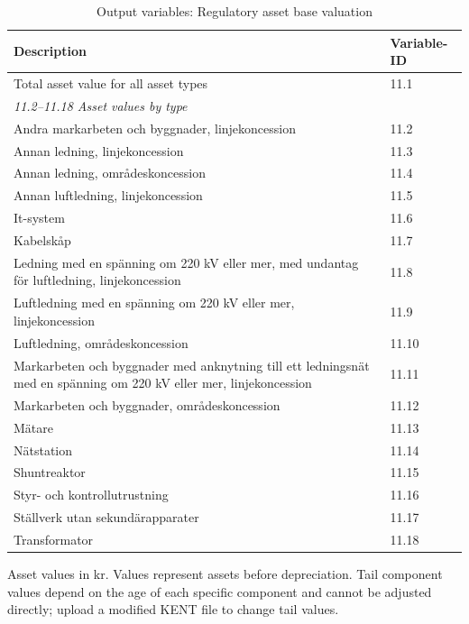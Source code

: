 \begin{table}[H]
\centering
\footnotesize
\begin{threeparttable}
\caption{Output variables: Regulatory asset base valuation}
\label{tab:rab-output-variables}
\begin{tabular}{@{}p{9cm}l@{}}
\toprule
\textbf{Description} & \textbf{Variable-ID} \\
\midrule
Total asset value for all asset types & 11.1 \\
\midrule
\multicolumn{2}{l}{\textit{11.2--11.18 Asset values by type}} \\
Andra markarbeten och byggnader, linjekoncession & 11.2 \\
Annan ledning, linjekoncession & 11.3 \\
Annan ledning, områdeskoncession & 11.4 \\
Annan luftledning, linjekoncession & 11.5 \\
It-system & 11.6 \\
Kabelskåp & 11.7 \\
Ledning med en spänning om 220 kV eller mer, med undantag för luftledning, linjekoncession & 11.8 \\
Luftledning med en spänning om 220 kV eller mer, linjekoncession & 11.9 \\
Luftledning, områdeskoncession & 11.10 \\
Markarbeten och byggnader med anknytning till ett ledningsnät med en spänning om 220 kV eller mer, linjekoncession & 11.11 \\
Markarbeten och byggnader, områdeskoncession & 11.12 \\
Mätare & 11.13 \\
Nätstation & 11.14 \\
Shuntreaktor & 11.15 \\
Styr- och kontrollutrustning & 11.16 \\
Ställverk utan sekundärapparater & 11.17 \\
Transformator & 11.18 \\
\bottomrule
\end{tabular}
\begin{tablenotes}
\item Asset values in kr. Values represent assets before depreciation. Tail component values depend on the age of each specific component and cannot be adjusted directly; upload a modified KENT file to change tail values.
\end{tablenotes}
\end{threeparttable}
\end{table}


